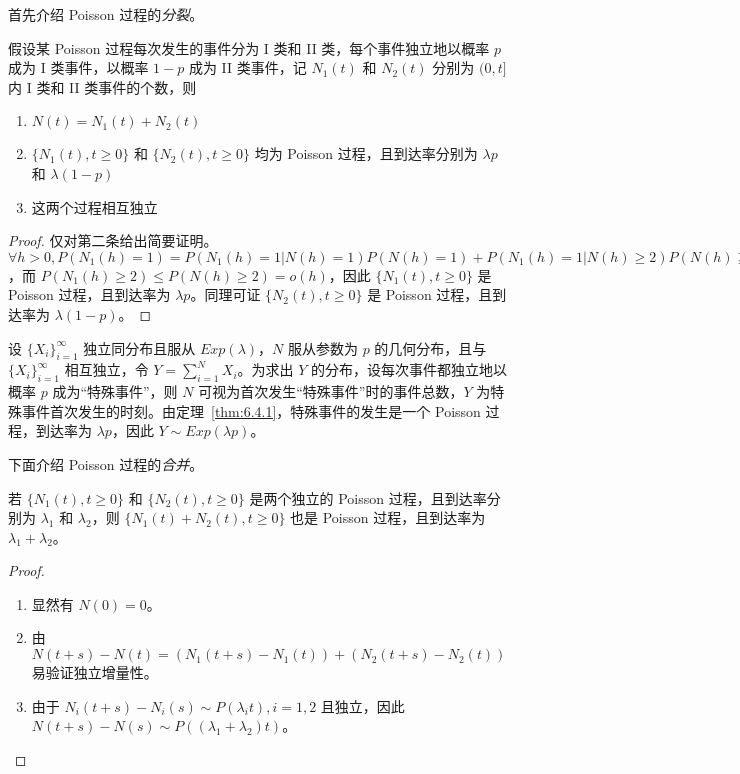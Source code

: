 \documentclass[../main.tex]{subfiles}
\begin{document}
首先介绍 Poisson 过程的\emph{分裂}。

\begin{theorem}\label{thm:6.4.1}
    假设某 Poisson 过程每次发生的事件分为 I 类和 II 类，每个事件独立地以概率 $p$ 成为 I 类事件，以概率 $1-p$ 成为 II 类事件，记 $N_1(t)$ 和 $N_2(t)$ 分别为 $(0,t]$ 内 I 类和 II 类事件的个数，则
    \begin{enumerate}
        \item $N(t)=N_1(t)+N_2(t)$
        \item $\{N_1(t),t\geq0\}$ 和 $\{N_2(t),t\geq0\}$ 均为 Poisson 过程，且到达率分别为 $\lambda p$ 和 $\lambda(1-p)$
        \item 这两个过程相互独立
    \end{enumerate}
\end{theorem}

\begin{proof}
    仅对第二条给出简要证明。$\forall h>0,P(N_1(h)=1)=P(N_1(h)=1|N(h)=1)P(N(h)=1)+P(N_1(h)=1|N(h)\geq2)P(N(h)\geq2)=p(\lambda h+o(h))+o(h)=\lambda ph+o(h)$，而 $P(N_1(h)\geq2)\leq P(N(h)\geq2)=o(h)$，因此 $\{N_1(t),t\geq0\}$ 是 Poisson 过程，且到达率为 $\lambda p$。同理可证 $\{N_2(t),t\geq0\}$ 是 Poisson 过程，且到达率为 $\lambda(1-p)$。
\end{proof}

\begin{example}
    设 $\{X_i\}_{i=1}^\infty$ 独立同分布且服从 $Exp(\lambda)$，$N$ 服从参数为 $p$ 的几何分布，且与 $\{X_i\}_{i=1}^\infty$ 相互独立，令 $Y=\sum_{i=1}^NX_i$。为求出 $Y$ 的分布，设每次事件都独立地以概率 $p$ 成为“特殊事件”，则 $N$ 可视为首次发生“特殊事件”时的事件总数，$Y$ 为特殊事件首次发生的时刻。由定理~\ref{thm:6.4.1}，特殊事件的发生是一个 Poisson 过程，到达率为 $\lambda p$，因此 $Y\sim Exp(\lambda p)$。
\end{example}

下面介绍 Poisson 过程的\emph{合并}。

\begin{theorem}\label{thm:6.4.2}
    若 $\{N_1(t),t\geq0\}$ 和 $\{N_2(t),t\geq0\}$ 是两个独立的 Poisson 过程，且到达率分别为 $\lambda_1$ 和 $\lambda_2$，则 $\{N_1(t)+N_2(t),t\geq0\}$ 也是 Poisson 过程，且到达率为 $\lambda_1+\lambda_2$。
\end{theorem}

\begin{proof}
    \mbox{}
    \begin{enumerate}
        \item 显然有 $N(0)=0$。
        \item 由 $N(t+s)-N(t)=(N_1(t+s)-N_1(t))+(N_2(t+s)-N_2(t))$ 易验证独立增量性。
        \item 由于 $N_i(t+s)-N_i(s)\sim P(\lambda_i t),i=1,2$ 且独立，因此 $N(t+s)-N(s)\sim P((\lambda_1+\lambda_2)t)$。
    \end{enumerate}
\end{proof}
\end{document}
